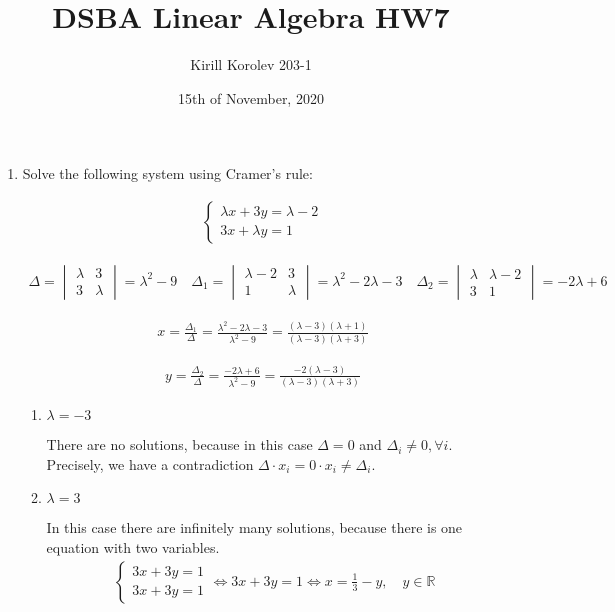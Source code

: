 \documentclass{article}
\title{DSBA Linear Algebra HW7}
\author{Kirill Korolev 203-1}
\date{15th of November, 2020}
\begin{document}
\maketitle

\begin{enumerate}

\item Solve the following system using Cramer’s rule:

\begin{align*}
\begin{cases}
\lambda x + 3y=\lambda - 2\\
3x+\lambda y=1
\end{cases}
\end{align*}

\begin{align*}
\Delta = \begin{vmatrix}
\lambda & 3\\
3 & \lambda
\end{vmatrix}=\lambda^2-9 \quad
\Delta_1 = \begin{vmatrix}
\lambda - 2 & 3\\
1 & \lambda
\end{vmatrix}=\lambda^2-2\lambda-3 \quad
\Delta_2 = \begin{vmatrix}
\lambda & \lambda-2\\
3 & 1
\end{vmatrix}=-2\lambda+6
\end{align*}

\begin{align*}
x = \frac{\Delta_1}{\Delta} = \frac{\lambda^2-2\lambda-3}{\lambda^2-9}=\frac{(\lambda-3)(\lambda+1)}{(\lambda-3)(\lambda+3)}
\end{align*}

\begin{align*}
y = \frac{\Delta_2}{\Delta} = \frac{-2\lambda+6}{\lambda^2-9}=\frac{-2(\lambda-3)}{(\lambda-3)(\lambda+3)}
\end{align*}

\begin{enumerate}
\item $\lambda = -3$

There are no solutions, because in this case $\Delta = 0$ and $\Delta_i \neq 0, \forall i$. Precisely, we have a contradiction $\Delta \cdot x_i = 0 \cdot x_i \neq \Delta_i$.
\item $\lambda = 3$

In this case there are infinitely many solutions, because there is one equation with two variables.
\begin{align*}
\begin{cases}
3x + 3y=1\\
3x+3y=1
\end{cases} \iff 3x + 3y=1 \iff x = \frac{1}{3} - y, \quad y \in \mathbb{R}
\end{align*}


\end{enumerate}
\end{enumerate}
\end{document}
